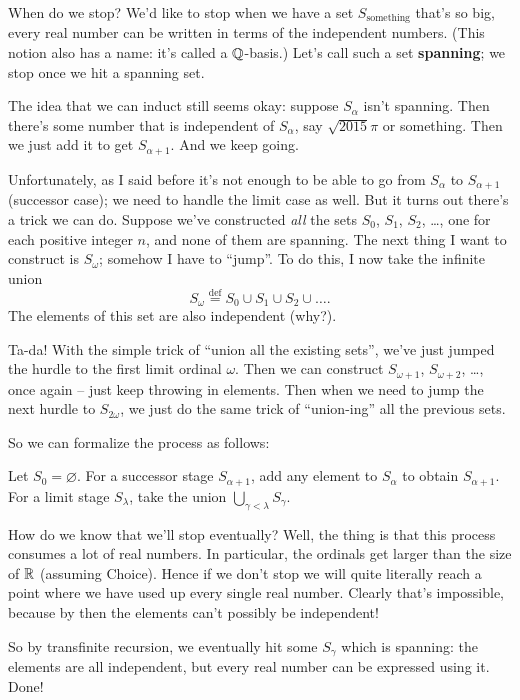 When do we stop?
We'd like to stop when we have a set $S_{\text{something}}$ that's so big,
every real number can be written in terms of the independent numbers.
(This notion also has a name: it's called a $\mathbb Q$-basis.)
Let's call such a set \textbf{spanning};
we stop once we hit a spanning set.

The idea that we can induct still seems okay:
suppose $S_\alpha$ isn't spanning.
Then there's some number that is independent of $S_\alpha$, say $\sqrt{2015}\pi$ or something.
Then we just add it to get $S_{\alpha+1}$.
And we keep going.

Unfortunately, as I said before it's not enough to be able to go from $S_\alpha$ to $S_{\alpha+1}$
(successor case); we need to handle the limit case as well.
But it turns out there's a trick we can do.
Suppose we've constructed \emph{all} the sets $S_0$, $S_1$, $S_2$, \dots, one for each positive integer $n$,
and none of them are spanning.
The next thing I want to construct is $S_\omega$; somehow I have to ``jump''.
To do this, I now take the infinite union
\[ S_\omega \overset{\text{def}}{=} S_0 \cup S_1 \cup S_2 \cup \dots. \]
The elements of this set are also independent (why?).

Ta-da!
With the simple trick of ``union all the existing sets'',
we've just jumped the hurdle to the first limit ordinal $\omega$.
Then we can construct $S_{\omega+1}$, $S_{\omega+2}$, \dots, once again --
just keep throwing in elements.
Then when we need to jump the next hurdle to $S_{2 \omega}$,
we just do the same trick of ``union-ing'' all the previous sets.

So we can formalize the process as follows:
\begin{enumerate}
	\ii Let $S_0 = \varnothing$.
	\ii For a successor stage $S_{\alpha+1}$, add any element to $S_\alpha$ to obtain $S_{\alpha+1}$.
	\ii For a limit stage $S_{\lambda}$, take the union $\bigcup_{\gamma < \lambda} S_\gamma$.
\end{enumerate}
How do we know that we'll stop eventually?
Well, the thing is that this process consumes a lot of real numbers.
In particular, the ordinals get larger than the size of $\mathbb R$ (assuming Choice).
Hence if we don't stop we will quite literally reach a point where we have used up every single real number.
Clearly that's impossible, because by then the elements can't possibly be independent!

So by transfinite recursion, we eventually hit some $S_\gamma$ which is spanning:
the elements are all independent, but every real number can be expressed using it.
Done!


